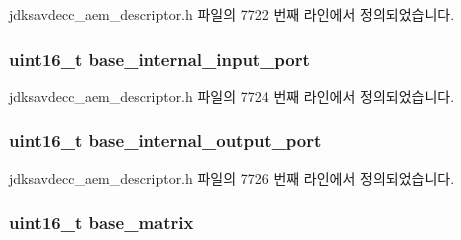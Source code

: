 jdksavdecc\+\_\+aem\+\_\+descriptor.\+h 파일의 7722 번째 라인에서 정의되었습니다.

\subsubsection[{\texorpdfstring{base\+\_\+internal\+\_\+input\+\_\+port}{base_internal_input_port}}]{\setlength{\rightskip}{0pt plus 5cm}uint16\+\_\+t base\+\_\+internal\+\_\+input\+\_\+port}\hypertarget{structjdksavdecc__descriptor__audio__unit_a11d926248b31db1ff60e6416c9c3d996}{}\label{structjdksavdecc__descriptor__audio__unit_a11d926248b31db1ff60e6416c9c3d996}


jdksavdecc\+\_\+aem\+\_\+descriptor.\+h 파일의 7724 번째 라인에서 정의되었습니다.

\subsubsection[{\texorpdfstring{base\+\_\+internal\+\_\+output\+\_\+port}{base_internal_output_port}}]{\setlength{\rightskip}{0pt plus 5cm}uint16\+\_\+t base\+\_\+internal\+\_\+output\+\_\+port}\hypertarget{structjdksavdecc__descriptor__audio__unit_a238f1b0f1c8556b5e9586d93541169a5}{}\label{structjdksavdecc__descriptor__audio__unit_a238f1b0f1c8556b5e9586d93541169a5}


jdksavdecc\+\_\+aem\+\_\+descriptor.\+h 파일의 7726 번째 라인에서 정의되었습니다.

\subsubsection[{\texorpdfstring{base\+\_\+matrix}{base_matrix}}]{\setlength{\rightskip}{0pt plus 5cm}uint16\+\_\+t base\+\_\+matrix}\hypertarget{structjdksavdecc__descriptor__audio__unit_a4faf17fd3b3d91f6b24fe8d66a042309}{}\label{structjdksavdecc__descriptor__audio__unit_a4faf17fd3b3d91f6b24fe8d66a042309}


